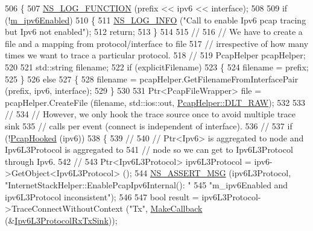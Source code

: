 \begin{DoxyCode}
506 \{
507   \hyperlink{log-macros-disabled_8h_a90b90d5bad1f39cb1b64923ea94c0761}{NS\_LOG\_FUNCTION} (prefix << ipv6 << interface);
508 
509   \textcolor{keywordflow}{if} (!\hyperlink{classns3_1_1InternetStackHelper_a2eade9878232a41166cd0638cab7c3bf}{m\_ipv6Enabled})
510     \{
511       \hyperlink{group__logging_gafbd73ee2cf9f26b319f49086d8e860fb}{NS\_LOG\_INFO} (\textcolor{stringliteral}{"Call to enable Ipv6 pcap tracing but Ipv6 not enabled"});
512       \textcolor{keywordflow}{return};
513     \}
514 
515   \textcolor{comment}{//}
516   \textcolor{comment}{// We have to create a file and a mapping from protocol/interface to file }
517   \textcolor{comment}{// irrespective of how many times we want to trace a particular protocol.}
518   \textcolor{comment}{//}
519   PcapHelper pcapHelper;
520 
521   std::string filename;
522   \textcolor{keywordflow}{if} (explicitFilename)
523     \{
524       filename = prefix;
525     \}
526   \textcolor{keywordflow}{else}
527     \{
528       filename = pcapHelper.GetFilenameFromInterfacePair (prefix, ipv6, interface);
529     \}
530 
531   Ptr<PcapFileWrapper> file = pcapHelper.CreateFile (filename, std::ios::out, 
      \hyperlink{classns3_1_1PcapHelper_a2ee4dad28ddd9a1fe636f51835eaa77facaa0d4a941d8f04ddafaa202c18298c1}{PcapHelper::DLT\_RAW});
532 
533   \textcolor{comment}{//}
534   \textcolor{comment}{// However, we only hook the trace source once to avoid multiple trace sink}
535   \textcolor{comment}{// calls per event (connect is independent of interface).}
536   \textcolor{comment}{//}
537   \textcolor{keywordflow}{if} (!\hyperlink{classns3_1_1InternetStackHelper_a884260b23b3df90bf09eeb403df4d988}{PcapHooked} (ipv6))
538     \{
539       \textcolor{comment}{//}
540       \textcolor{comment}{// Ptr<Ipv6> is aggregated to node and Ipv6L3Protocol is aggregated to }
541       \textcolor{comment}{// node so we can get to Ipv6L3Protocol through Ipv6.}
542       \textcolor{comment}{//}
543       Ptr<Ipv6L3Protocol> ipv6L3Protocol = ipv6->GetObject<Ipv6L3Protocol> ();
544       \hyperlink{assert_8h_aff5ece9066c74e681e74999856f08539}{NS\_ASSERT\_MSG} (ipv6L3Protocol, \textcolor{stringliteral}{"InternetStackHelper::EnablePcapIpv6Internal(): "}
545                      \textcolor{stringliteral}{"m\_ipv6Enabled and ipv6L3Protocol inconsistent"});
546 
547       \textcolor{keywordtype}{bool} result = ipv6L3Protocol->TraceConnectWithoutContext (\textcolor{stringliteral}{"Tx"}, 
      \hyperlink{group__makecallbackmemptr_ga9376283685aa99d204048d6a4b7610a4}{MakeCallback} (&\hyperlink{namespacens3_a3af463351b1701a7898a00fc29f2f016}{Ipv6L3ProtocolRxTxSink}));

\end{DoxyCode}
